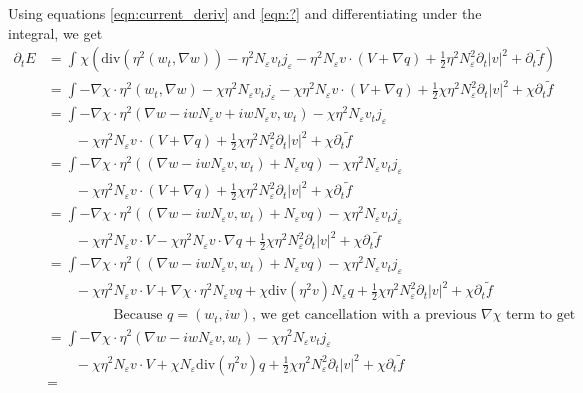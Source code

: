 \documentclass[a4paper]{article}
\renewcommand{\div}{\mathrm{div}}
\begin{document}
Using equations \eqref{eqn:current_deriv} and \eqref{eqn:?} and differentiating under the integral, we get
\begin{align}
  \partial_t E &= \int_{}^{} \chi \left( \div(\eta^2 (w_t, \nabla w)) - \eta^2 N_\varepsilon v_t j_\varepsilon - \eta^2 N_\varepsilon v \cdot (V + \nabla q) +
  \frac{1}{2} \eta^2 N_\varepsilon^2 \partial_t |v|^2 + \partial_t \tilde{f} \right) \nonumber \\
  &= \int - \nabla \chi \cdot \eta^2 (w_t, \nabla w) - \chi \eta^2 N_\varepsilon v_t j_\varepsilon - \chi \eta^2 N_\varepsilon v \cdot (V + \nabla q)
  + \frac{1}{2} \chi \eta^2 N_\varepsilon^2 \partial_t |v|^2 + \chi \partial_t \tilde{f} \nonumber \\
  &= \int - \nabla \chi \cdot \eta^2 ( \nabla w - i w N_\varepsilon v + i w N_\varepsilon v, w_t) - \chi \eta^2 N_\varepsilon v_t j_\varepsilon
  \nonumber \\
  &\quad \quad - \chi \eta^2 N_\varepsilon v \cdot (V + \nabla q) + \frac{1}{2} \chi \eta^2 N_\varepsilon^2 \partial_t |v|^2 + \chi \partial_t \tilde{f} \nonumber \\
  &= \int - \nabla \chi \cdot \eta^2 \left( (\nabla w - iw N_\varepsilon v, w_t) + N_\varepsilon v q \right) - \chi \eta^2
  N_\varepsilon v_t j_\varepsilon \nonumber \\
  &\quad \quad - \chi \eta^2 N_\varepsilon v \cdot (V+\nabla q) + \frac{1}{2} \chi \eta^2 N_\varepsilon^2 \partial_t |v|^2 + \chi \partial_t \tilde{f} \nonumber \\
  &= \int - \nabla \chi \cdot \eta^2 ( (\nabla w - iw N_\varepsilon v, w_t) + N_\varepsilon v q ) - \chi \eta^2 N_\varepsilon v_t j_\varepsilon
  \nonumber \\
  &\quad \quad - \chi \eta^2 N_\varepsilon v \cdot V - \chi \eta^2 N_\varepsilon v \cdot \nabla q + \frac{1}{2} \chi \eta^2 N_\varepsilon^2 \partial_t |v|^2 + \chi \partial_t \tilde{f}
  \nonumber \\
  &= \int - \nabla \chi \cdot \eta^2 ( ( \nabla w - i w N_\varepsilon v, w_t) + N_\varepsilon v q ) - \chi \eta^2 N_\varepsilon v_t
  j_\varepsilon \nonumber \\
  &\quad \quad - \chi \eta^2 N_\varepsilon v \cdot V + \nabla \chi \cdot \eta^2 N_\varepsilon v q + \chi \div (\eta^2 v) N_\varepsilon q
  + \frac{1}{2} \chi \eta^2 N_\varepsilon^2 \partial_t |v|^2 + \chi \partial_t \tilde{f} \nonumber \\
  &\hspace{2cm} \text{Because } q = (w_t, iw) \text{, we get cancellation with a previous $\nabla \chi$ term to get} \nonumber \\
  &= \int - \nabla \chi \cdot \eta^2 ( \nabla w - iw N_\varepsilon v, w_t) - \chi \eta^2 N_\varepsilon v_t j_\varepsilon \nonumber \\
  &\quad \quad - \chi \eta^2 N_\varepsilon v \cdot V + \chi N_\varepsilon \div (\eta^2 v) q +
  \frac{1}{2} \chi \eta^2 N_\varepsilon^2 \partial_t |v|^2 + \chi \partial_t \tilde{f} \nonumber \\
  &=
  \label{eqn:energy_deriv}
\end{align}
\end{document}
